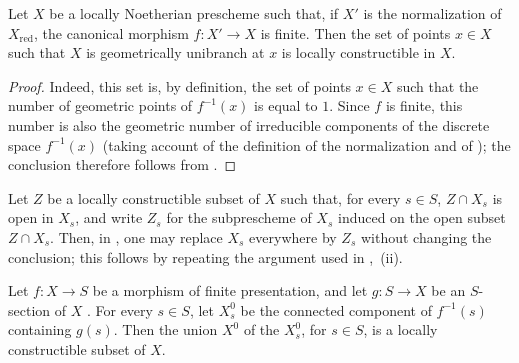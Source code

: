 \begin{corollary}[9.7.10]
\label{IV.9.7.10}
Let $X$ be a locally Noetherian prescheme such that, if $X'$ is the normalization of $X_{\mathrm{red}}$, the canonical morphism $f:X'\to X$ is finite. Then the set of points $x\in X$ such that $X$ is geometrically unibranch at $x$ is locally constructible in $X$.
\end{corollary}

\begin{proof}
Indeed, this set is, by definition, the set of points $x\in X$ such that the number of geometric points of $f^{-1}(x)$ is equal to $1$. Since $f$ is finite, this number is also the geometric number of irreducible components of the discrete space $f^{-1}(x)$ (taking account of the definition of the normalization  and of ); the conclusion therefore follows from .
\end{proof}

\begin{remark}[9.7.11]
\label{IV.9.7.11}
Let $Z$ be a locally constructible subset of $X$ such that, for every $s\in S$, $Z\cap X_s$ is open in $X_s$, and write $Z_s$ for the subprescheme of $X_s$ induced on the open subset $Z\cap X_s$. Then, in , one may replace $X_s$ everywhere by $Z_s$ without changing the conclusion; this follows by repeating the argument used in ,~(ii).
\end{remark}

\begin{proposition}[9.7.12]
\label{IV.9.7.12}
Let $f:X\to S$ be a morphism of finite presentation, and let $g:S\to X$ be an $S$-section of $X$ . For every $s\in S$, let $X_s^0$ be the connected component of $f^{-1}(s)$ containing $g(s)$. Then the union $X^0$ of the $X_s^0$, for $s\in S$, is a locally constructible subset of $X$.
\end{proposition}

